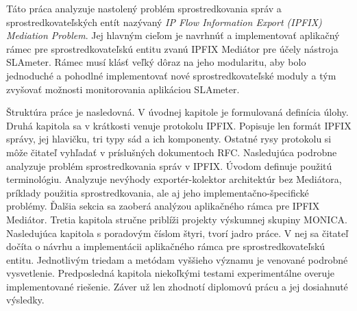 Táto práca analyzuje nastolený problém sprostredkovania správ a sprostredkovateľských entít nazývaný 
\emph{IP Flow Information Export (IPFIX) Mediation Problem}. Jej hlavným cieľom je navrhnúť a implementovať
aplikačný rámec pre sprostredkovateľskú entitu zvanú IPFIX Mediátor pre účely nástroja SLAmeter. 
Rámec musí klásť veľký dôraz na jeho modularitu, aby bolo jednoduché a pohodlné implementovať nové 
sprostredkovateľské moduly a tým zvyšovať možnosti monitorovania aplikáciou SLAmeter.

Štruktúra práce je nasledovná. V úvodnej kapitole je formulovaná definícia úlohy. Druhá kapitola sa 
v krátkosti venuje protokolu IPFIX. Popisuje len formát IPFIX správy, jej hlavičku, tri typy
sád a ich komponenty. Ostatné rysy protokolu si môže čitateľ vyhľadať v príslušných dokumentoch RFC.
Nasledujúca podrobne analyzuje problém sprostredkovania správ v IPFIX. Úvodom definuje použitú 
terminológiu. Analyzuje nevýhody exportér-kolektor architektúr bez Mediátora, príklady použitia 
sprostredkovania, ale aj jeho implementačno-špecifické problémy. Ďalšia sekcia sa zaoberá analýzou 
aplikačného rámca pre IPFIX Mediátor. Tretia kapitola stručne priblíži projekty výskumnej skupiny MONICA.
Nasledujúca kapitola s poradovým číslom štyri, tvorí jadro práce. V nej sa čitateľ dočíta o návrhu a 
implementácii aplikačného rámca pre sprostredkovateľskú entitu. Jednotlivým triedam a metódam vyššieho 
významu je venované podrobné vysvetlenie. Predposledná kapitola niekoľkými testami experimentálne 
overuje implementované riešenie. Záver už len zhodnotí diplomovú prácu a jej dosiahnuté výsledky. 



